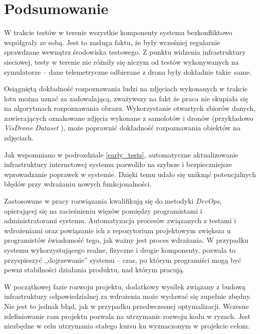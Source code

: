 \chapter{Podsumowanie}


W trakcie testów w terenie wszystkie komponenty systemu bezkonfliktowo współgrały
ze sobą. Jest to zasługa faktu, że były wcześniej regularnie sprawdzane
wewnątrz środowiska testowego. Z punktu widzenia infrastruktury sieciowej,
testy w terenie nie różniły się niczym od testów wykonywanych na symulatorze --
dane telemetryczne odbierane z drona były dokładnie takie~same.

Osiągniętą dokładność rozpoznawania ludzi na zdjęciach wykonanych w trakcie lotu
można uznać za zadowalającą, zważywszy na fakt że praca nie skupiała się na
algorytmach rozpoznawania obrazu. Wykorzystanie otwartych zbiorów danych, zawierających
oznakowane zdjęcia wykonane z samolotów i dronów (przykładowo \textit{VisDrone Dataset} \cite{visdrone}),
może poprawnić dokładność rozpoznawania obiektów na zdjęciach.

Jak wspomniano w podrozdziale \ref{early_tests}, automatyczne aktualizowanie infrastruktury
internetowej systemu pozwoliło na szybsze i bezpieczniejsze wprowadzanie poprawek w systemie.
Dzięki temu udało się uniknąć potencjalnych błędów przy wdrażaniu nowych funkcjonalności.

Zastosowane w pracy rozwiązania kwalifikują się do metodyki \textit{DevOps}, opierającej
się na zacieśnieniu więzów pomiędzy programistami i administratorami systemu.
Automatyzacja procesów związanych z testami i wdrożeniami oraz powiązanie ich
z repozytorium projektowym zwiększa u programistów świadomość tego, jak ważny jest proces wdrażania.
W przypadku systemu wykorzystującego realne, fizyczne i drogie komponenty, pozwala to 
przyspieszyć ,,dojrzewanie'' systemu -- czas, po którym programiści mogą być pewni stabilności
działania produktu, nad którym pracują.

W początkowej fazie rozwoju projektu, dodatkowy wysiłek związany z budową infrastruktury
odpowiedzialnej za wdrożenia może wydawać się zupełnie zbędny. Nie jest to jednak 
błąd, jak w przypadku przedwczesnej optymalizacji. Wczesne zdefiniowanie ram projektu
pozwala na utrzymanie rozwoju kodu w ryzach. Jest niezbędne w celu utrzymania
stałego kursu ku wyznaczonym w projekcie celom.

